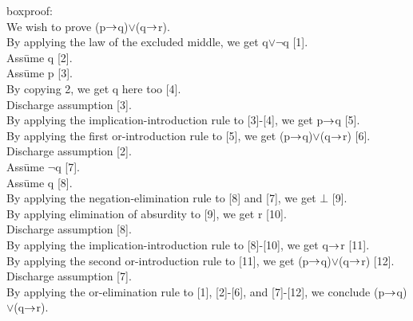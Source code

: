 \begin{tabbing}
boxproof:\\
We wish to prove (p\(\rightarrow\)q)\(\lor\)(q\(\rightarrow\)r).\\
By applying the law of the excluded middle, we get q\(\lor\)\(\neg\)q [1].\\
Ass\=ume \+ q [2].\\ 
	Ass\=ume \+ p [3].\\
		By copying 2, we get q here too [4].\\
	\< \- Discharge assumption [3].\\
	By applying the implication-introduction rule to [3]-[4], we get p\(\rightarrow\)q [5].\\
	By applying the first or-introduction rule to [5], we get (p\(\rightarrow\)q)\(\lor\)(q\(\rightarrow\)r) [6].\\
\< \- Discharge assumption [2].\\
Ass\=ume \+ \(\neg\)q [7].\\
	Ass\=ume \+ q [8].\\
		By applying the negation-elimination rule to [8] and [7], we get \(\bot\) [9].\\
		By applying elimination of absurdity to [9], we get r [10].\\
	\< \- Discharge assumption [8].\\
	By applying the implication-introduction rule to [8]-[10], we get q\(\rightarrow\)r [11].\\
	By applying the second or-introduction rule to [11], we get (p\(\rightarrow\)q)\(\lor\)(q\(\rightarrow\)r) [12].\\
\< \- Discharge assumption [7].\\
By applying the or-elimination rule to [1], [2]-[6], and [7]-[12], we conclude (p\(\rightarrow\)q)\(\lor\)(q\(\rightarrow\)r).
\end{tabbing}
